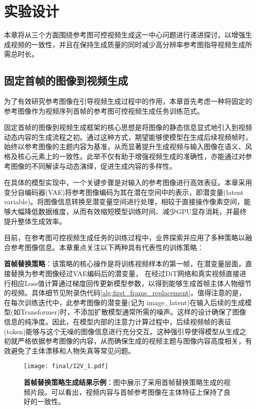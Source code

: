 \section{实验设计}
本章将从三个方面围绕参考图可控视频生成这一中心问题进行递进探讨，以增强生成视频的一致性，并且在保持生成质量的同时减少高分辨率参考图指导视频生成所需总时长。
\subsection{固定首帧的图像到视频生成}\label{sec1}
为了有效研究参考图像在引导视频生成过程中的作用，本章首先考虑一种将固定的参考图像作为视频序列首帧的参考图可控视频生成任务训练范式。

固定首帧的图像到视频生成框架的核心思想是将图像的静态信息显式地引入到视频动态内容的生成流程之初。通过这种方式，期望能够使模型在生成后续视频帧时，始终以参考图像的主题内容为基准，从而显著提升生成视频与输入图像在语义、风格及核心元素上的一致性。此举不仅有助于增强视频生成的准确性，亦能通过对参考图像的不同解读与动态演绎，促进生成内容的多样性。

在具体的模型实现中，一个关键步骤是对输入的参考图像进行高效表征。本章采用变分自编码器(VAE)将参考图像编码为其在潜在空间中的表示，即潜变量(latent variable)。将图像信息转换至潜变量空间进行处理，相较于直接操作像素空间，能够大幅降低数据维度，从而有效缩短模型训练时间、减少GPU显存消耗，并最终提升整体生成效率。

目前，在参考图可控视频生成任务的训练过程中，业界探索并应用了多种策略以融合参考图像信息。本章重点关注以下两种具有代表性的训练策略：

\textbf{首帧替换策略}：该策略的核心操作是将训练视频样本的第一帧，在潜变量层面，直接替换为参考图像经过VAE编码后的潜变量， 在经过DiT网络和真实视频直接进行相应Loss值计算通过梯度回传更新模型参数，以得到能够生成首帧主体人物细节的视频。具体细节见附录伪代码\ref{alg:first_frame_replacement}。值得注意的是，在每次训练迭代中，此参考图像的潜变量(记为 image\_latent)在输入后续的生成模型(如Transformer)时，不添加扩散模型通常所需的噪声。这样的设计确保了图像信息的纯净度。因此，在模型内部的注意力计算过程中，后续视频帧的表征(token)能够与这个无噪的图像信息进行充分交互。这种强引导使得模型从生成之初就严格依据参考图像的内容，从而确保生成的视频主题与图像内容高度相关，有效避免了主体漂移和人物失真等常见问题。
 

\begin{figure}[htbp]
    \centering
    \texttt{[image: final/I2V\_1.pdf]}
    \caption{\textbf{首帧替换策略生成结果示例}：图中展示了采用首帧替换策略生成的视频片段。可以看出，视频内容与首帧参考图像在主体特征上保持了良好的一致性。}
    \label{I2V_1}
\end{figure}


